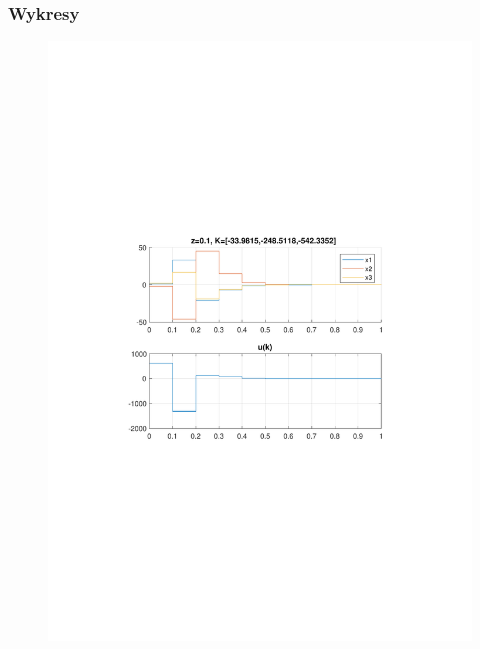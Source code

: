 \documentclass{article}
\begin{document}
\subsubsection{Wykresy}
\begin{figure}[H]
\includegraphics[clip, trim=0.5cm 9.5cm 0.5cm 9.5cm, width=1.00\textwidth]{../rys/zad3_rys1.pdf}
\label{fig:rys3.1.1}

\end{figure}
\end{document}
